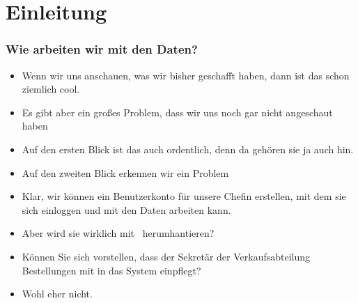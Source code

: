 \documentclass[aspectratio=169,mathserif,notheorems]{beamer}%
\subtitle{16.~Von Python auf PostgreSQL Zugreifen}%
\begin{document}
%
%
%
%
\startPresentation%
%
\section{Einleitung}%
%
\begin{frame}%
\frametitle{Wie arbeiten wir mit den Daten?}%
\begin{itemize}%
\item Wenn wir uns anschauen, was wir bisher geschafft haben, dann ist das schon ziemlich cool.%
\item<2-> Es gibt aber ein großes Problem, dass wir uns noch gar nicht angeschaut haben%
\item<4-> Auf den ersten Blick ist das auch ordentlich, denn da gehören sie ja auch hin.%
\item<5-> Auf den zweiten Blick erkennen wir ein Problem%
\item<7-> Klar, wir können ein Benutzerkonto  für unsere Chefin erstellen, mit dem sie sich einloggen und mit den Daten arbeiten kann.%
\item<8-> Aber wird sie wirklich mit \sql\ herumhantieren?%
\item<9-> Können Sie sich vorstellen, dass der Sekretär der Verkaufsabteilung Bestellungen mit  in das System einpflegt?%
\item<10-> Wohl eher nicht.%
\end{itemize}%
\end{frame}%
%
\end{document}
